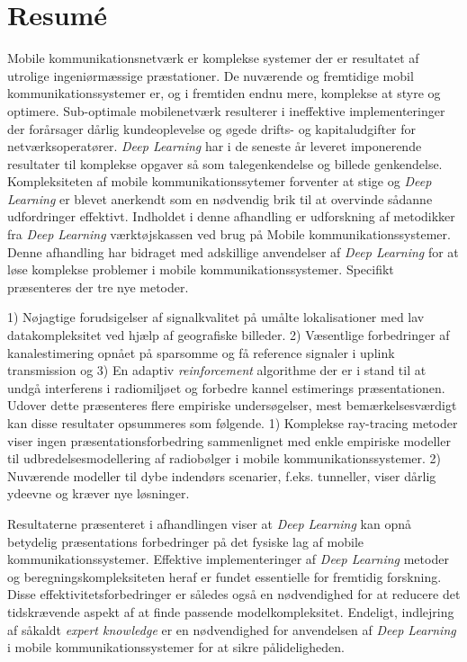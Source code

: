 \chapter*{Resumé}
Mobile kommunikationsnetværk er komplekse systemer der er resultatet af utrolige ingeniørmæssige præstationer. De nuværende og fremtidige mobil kommunikationssystemer er, og i fremtiden endnu mere, komplekse at styre og optimere. Sub-optimale mobilenetværk resulterer i ineffektive implementeringer der forårsager dårlig kundeoplevelse og øgede drifts- og kapitaludgifter for netværksoperatører. \emph{Deep Learning} har i de seneste år leveret imponerende resultater til komplekse opgaver så som talegenkendelse og billede genkendelse. Kompleksiteten af mobile kommunikationssytemer forventer at stige og \emph{Deep Learning} er blevet anerkendt som en nødvendig brik til at overvinde sådanne udfordringer effektivt. Indholdet i denne afhandling er udforskning af metodikker fra \emph{Deep Learning} værktøjskassen ved brug på Mobile kommunikationssystemer. Denne afhandling har bidraget med adskillige anvendelser af \emph{Deep Learning} for at løse komplekse problemer i mobile kommunikationssystemer. Specifikt præsenteres der tre nye metoder.

1) Nøjagtige forudsigelser af signalkvalitet på umålte lokalisationer med lav datakompleksitet ved hjælp af geografiske billeder. 2) Væsentlige forbedringer af kanalestimering opnået på sparsomme og få reference signaler i uplink transmission og 3) En adaptiv \emph{reinforcement} algorithme der er i stand til at undgå interferens i radiomiljøet og forbedre kannel estimerings præsentationen. Udover dette præsenteres flere empiriske undersøgelser, mest bemærkelsesværdigt kan disse resultater opsummeres som følgende. 1) Komplekse ray-tracing metoder viser ingen præsentationsforbedring sammenlignet med enkle empiriske modeller til udbredelsesmodellering af radiobølger i mobile kommunikationssystemer. 2) Nuværende modeller til dybe indendørs scenarier, f.eks. tunneller, viser dårlig ydeevne og kræver nye løsninger.

Resultaterne præsenteret i afhandlingen viser at \emph{Deep Learning} kan opnå betydelig præsentations forbedringer på det fysiske lag af mobile kommunikationssystemer. Effektive implementeringer af \emph{Deep Learning} metoder og beregningskompleksiteten heraf er fundet essentielle for fremtidig forskning. Disse effektivitetsforbedringer er således også en nødvendighed for at reducere det tidskrævende aspekt af at finde passende modelkompleksitet. Endeligt, indlejring af såkaldt \emph{expert knowledge} er en nødvendighed for anvendelsen af \emph{Deep Learning} i mobile kommunikationssystemer for at sikre pålideligheden.
